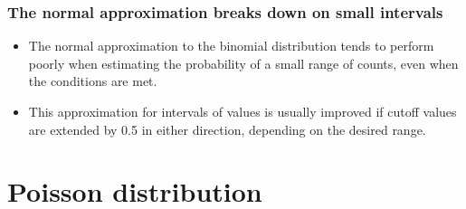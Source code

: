 \documentclass[slidestop,compress,mathserif]{beamer}
\makeatletter
\def\weekv@path{../../Week5}
\makeatother
\begin{document}
\begin{frame}
\frametitle{The normal approximation breaks down on small intervals}

\begin{itemize}

\item The normal approximation to the binomial distribution tends to perform poorly when estimating the probability of a small range of counts, even when the conditions are met.

\item This approximation for intervals of values is usually improved if cutoff values are extended by 0.5 in either direction, depending on the desired range.

\end{itemize}


\end{frame}



\section{Poisson distribution}

\end{document}
